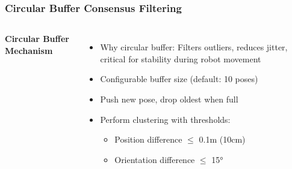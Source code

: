 \documentclass[serif, aspectratio=169, 9pt]{beamer}
\begin{document}
\begin{frame}
\frametitle{Circular Buffer Consensus Filtering}
    \begin{columns}
        \textbf{Circular Buffer Mechanism}
        \begin{itemize}
            \item Why circular buffer: Filters outliers, reduces jitter, critical for stability during robot movement
            \item Configurable buffer size (default: 10 poses)
            \item Push new pose, drop oldest when full
            \item Perform clustering with thresholds:
            \begin{itemize}
                \item Position difference $\leq$ 0.1m (10cm)
                \item Orientation difference $\leq$ 15°
            \end{itemize}

\end{itemize}
\end{columns}
\end{frame}
\end{document}
